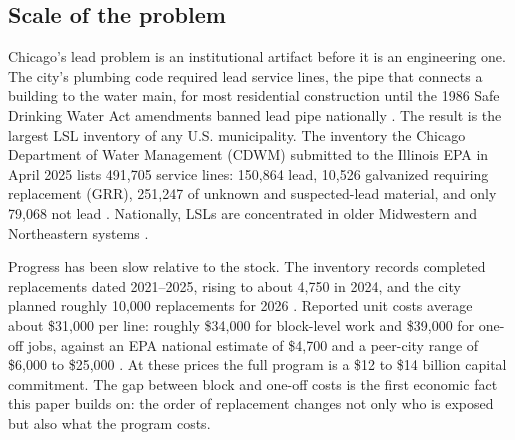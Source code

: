\documentclass[11pt]{article}
\begin{document}
\subsection{Scale of the problem}
Chicago's lead problem is an institutional artifact before it is an engineering one. The city's
plumbing code required lead service lines, the pipe that connects a building to the water main,
for most residential construction until the 1986 Safe Drinking Water Act amendments banned lead
pipe nationally \citep{troesken2006}. The result is the largest LSL inventory of any U.S.
municipality. The inventory the Chicago Department of Water Management (CDWM) submitted to the
Illinois EPA in April 2025 lists 491,705 service lines: 150,864 lead, 10,526 galvanized requiring
replacement (GRR), 251,247 of unknown and suspected-lead material, and only 79,068 not lead
\citep{icn2025data}. Nationally, LSLs are concentrated in older Midwestern and Northeastern systems
\citep{cornwell2016}.

Progress has been slow relative to the stock. The inventory records \NReplaced{} completed
replacements dated 2021--2025, rising to about 4,750 in 2024, and the city planned roughly 10,000
replacements for 2026 \citep{wttw2025}. Reported unit costs average about \$31,000 per line:
roughly \$34,000 for block-level work and \$39,000 for one-off jobs, against an EPA national
estimate of \$4,700 and a peer-city range of \$6,000 to \$25,000 \citep{icn2026cost}. At these
prices the full program is a \$12 to \$14 billion capital commitment. The gap between block and
one-off costs is the first economic fact this paper builds on: the order of replacement changes
not only who is exposed but also what the program costs.
\end{document}
